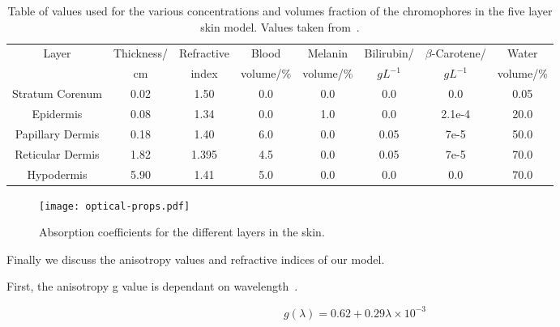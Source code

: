 \begin{table}[!tbhp] 
    \begin{adjustwidth}{-.5in}{-.5in}  

  \begin{center}
  \begin{tabular}{|c|c|c|c|c|c|c|c|}
  \hline
  Layer & Thickness/ & Refractive & Blood & Melanin & Bilirubin/ & $\beta$-Carotene/ & Water\\
    &cm & index & volume/\% & volume/\% & $gL^{-1}$ & $gL^{-1}$ & volume/\%\\
  \hline
  Stratum Corenum  & 0.02 & 1.50  & 0.0 & 0.0 & 0.0  & 0.0 & 0.05\\
  Epidermis        & 0.08 & 1.34  & 0.0 & 1.0 & 0.0  & 2.1e-4 & 20.0\\
  Papillary Dermis & 0.18 & 1.40  & 6.0 & 0.0 & 0.05 & 7e-5 & 50.0\\
  Reticular Dermis & 1.82 & 1.395 & 4.5 & 0.0 & 0.05 & 7e-5 & 70.0\\
  Hypodermis       & 5.90 & 1.41  & 5.0 & 0.0 & 0.0  & 0.0 & 70.0\\

  \hline
  \end{tabular}
    \caption{Table of values used for the various concentrations and volumes fraction of the chromophores in the five layer skin model. Values taken from~\cite{krishnaswamy2004biophysically,meglinski2002quantitative,campbell20153d,iglesias2015biophysically}.}
  \label{tab:optpropsvals}
  \end{center}
      \end{adjustwidth}

\end{table}


\begin{figure}[!htpb]
  \centering
  \texttt{[image: optical-props.pdf]}
  \caption{Absorption coefficients for the different layers in the skin.}
  \label{fig:absoplayers}
\end{figure}

\FloatBarrier

Finally we discuss the anisotropy values and refractive indices of our model.

First, the anisotropy g value is dependant on wavelength~\cite{louisethesis,van1989skin}.

\begin{equation}
g(\lambda)=0.62+0.29\lambda\times10^{-3}
\end{equation}

